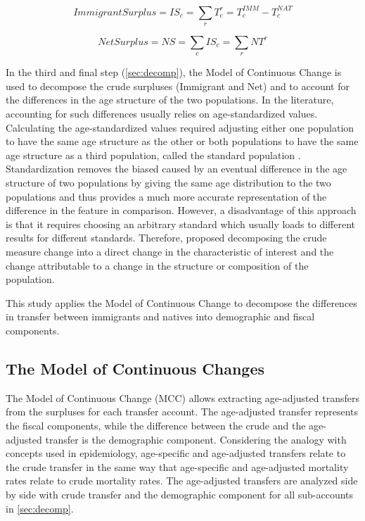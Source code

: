 \begin{equation}\label{eq:is}
  Immigrant Surplus=IS_{c}= \displaystyle\sum_{r}T^{r}_{c}=T^{IMM}_{c}-T^{NAT}_{c}
\end{equation}

\begin{equation}\label{eq:ns}
  Net Surplus = NS = \displaystyle\sum_{c}IS_{c} = \displaystyle\sum_{r}NT^{r}
\end{equation}

\vspace{0.7em}\par
In the third and final step (\autoref{sec:decomp}), the Model of Continuous Change \citep{Horiuchi:2008cn} is used to decompose the crude surpluses (Immigrant and Net) and to account for the differences in the age structure of the two populations.
In the literature, accounting for such differences usually relies on age-standardized values.
Calculating the age-standardized values required adjusting either one population to have the same age structure as the other or both populations to have the same age structure as a third population, called the standard population \citep{statCan:001}.
Standardization removes the biased caused by an eventual difference in the age structure of two populations by giving the same age distribution to the two populations and thus provides a much more accurate representation of the difference in the feature in comparison.
However, a disadvantage of this approach is that it requires choosing an arbitrary standard which usually loads to different results for different standards.
Therefore, \citet{Prskawetz:2005dx} proposed decomposing the crude measure change into a direct change in the characteristic of interest and the change attributable to a change in the structure or composition of the population.

\vspace{0.7em}\par
This study applies the Model of Continuous Change \citep{Horiuchi:2008cn} to decompose the differences in transfer between immigrants and natives into demographic and fiscal components.

\subsection{The Model of Continuous Changes}\label{sec:modelMCC}

The Model of Continuous Change (MCC) allows extracting age-adjusted transfers from the surpluses for each transfer account.
The age-adjusted transfer represents the fiscal components, while the difference between the crude and the age-adjusted transfer is the demographic component.
Considering the analogy with concepts used in epidemiology, age-specific and age-adjusted transfers relate to the crude transfer in the same way that age-specific and age-adjusted mortality rates relate to crude mortality rates.
The age-adjusted transfers are analyzed side by side with crude transfer and the demographic component for all sub-accounts in \autoref{sec:decomp}.

